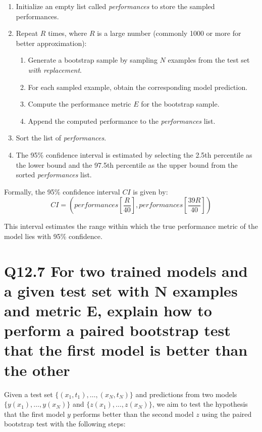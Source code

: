 \documentclass[11pt]{article}
\begin{document}
\begin{enumerate}
    \item Initialize an empty list called \textit{performances} to store the sampled performances.
    \item Repeat $R$ times, where $R$ is a large number (commonly 1000 or more for better approximation):
    \begin{enumerate}
        \item Generate a bootstrap sample by sampling $N$ examples from the test set \textit{with replacement}.
        \item For each sampled example, obtain the corresponding model prediction.
        \item Compute the performance metric $E$ for the bootstrap sample.
        \item Append the computed performance to the \textit{performances} list.
    \end{enumerate}
    \item Sort the list of \textit{performances}.
    \item The 95\% confidence interval is estimated by selecting the 2.5th percentile as the lower bound and the 97.5th percentile as the upper bound from the sorted \textit{performances} list.
\end{enumerate}

Formally, the 95\% confidence interval $CI$ is given by:
\[
CI = \left( \textit{performances}\left[ \frac{R}{40} \right], \textit{performances}\left[ \frac{39R}{40} \right] \right)
\]

This interval estimates the range within which the true performance metric of the model lies with 95\% confidence.

\section{Q12.7 For two trained models and a given test set with N examples and metric E, explain how to perform a paired bootstrap test that the first model is better than the other}


Given a test set $\{ (x_1, t_1), \ldots, (x_N, t_N) \}$ and predictions from two models $\{y(x_1), \ldots, y(x_N)\}$ and $\{z(x_1), \ldots, z(x_N)\}$, we aim to test the hypothesis that the first model \(y\) performs better than the second model \(z\) using the paired bootstrap test with the following steps:
\end{document}
